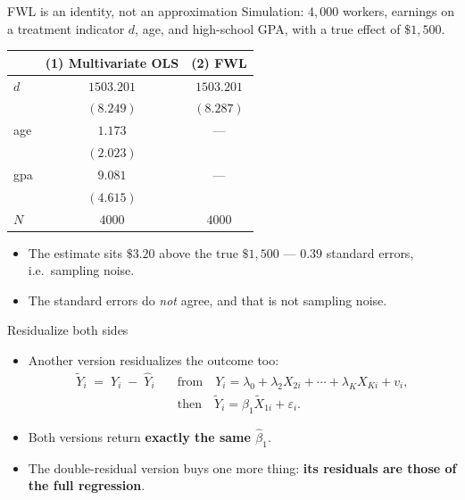 \documentclass[
  11pt,
  ignorenonframetext,
  aspectratio=169,
]{beamer}
\providecommand{\tightlist}{%
  \setlength{\itemsep}{0pt}\setlength{\parskip}{0pt}}
\begin{document}
\begin{frame}{FWL is an identity, not an approximation}
\protect{}\label{fwl-is-an-identity-not-an-approximation}
Simulation: \(4{,}000\) workers, earnings on a treatment indicator
\(d\), age, and high-school GPA, with a true effect of \(\$1{,}500\).

\begin{center}
\footnotesize
\begin{tabular}{lcc}
\toprule
 & (1) Multivariate OLS & (2) FWL \\
\midrule
$d$   & $1503.201$ & $1503.201$ \\
      & $(8.249)$  & $(8.287)$ \\
age   & $1.173$    & --- \\
      & $(2.023)$  & \\
gpa   & $9.081$    & --- \\
      & $(4.615)$  & \\
$N$   & $4000$     & $4000$ \\
\bottomrule
\end{tabular}
\end{center}

\begin{itemize}
\tightlist
\item
  The estimate sits \(\$3.20\) above the true \(\$1{,}500\) --- \(0.39\)
  standard errors, i.e.~sampling noise.
\item
  The standard errors do \emph{not} agree, and that is not sampling
  noise.
\end{itemize}
\end{frame}

\begin{frame}{Residualize both sides}
\protect{}\label{residualize-both-sides}
\begin{itemize}
\tightlist
\item
  Another version residualizes the outcome too: \[
  \begin{aligned}
  \tilde Y_i \;=\; Y_i \;-\; \hat Y_i &\quad\text{from}\quad Y_i = \lambda_0 + \lambda_2 X_{2i} + \cdots + \lambda_K X_{Ki} + v_i,\\
  &\quad\text{then}\quad \tilde Y_i = \beta_1 \tilde X_{1i} + \varepsilon_i.
  \end{aligned}
  \]
\item
  Both versions return \textbf{exactly the same \(\hat\beta_1\)}.
\item
  The double-residual version buys one more thing: \textbf{its residuals
  are those of the full regression}.
\end{itemize}
\end{frame}
\end{document}
